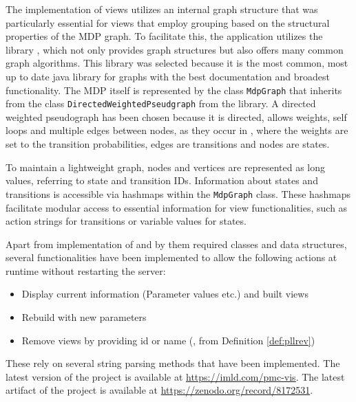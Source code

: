 \documentclass[preview]{standalone}
\begin{document}
The implementation of views utilizes an internal graph structure that was particularly essential for views that employ grouping based on the structural properties of the MDP graph. To facilitate this, the application utilizes the \jgrapht library \cite{Michail2020}, which not only provides graph structures but also offers many common graph algorithms. This library was selected because it is the most common, most up to date java library for graphs with the best documentation and broadest functionality. The MDP itself is represented by the class \texttt{MdpGraph} that inherits from the class \texttt{DirectedWeightedPseudgraph} from the \jgrapht library. A directed weighted pseudograph has been chosen because it is directed, allows weights, self loops and multiple edges between nodes, as they occur in \chgphsN, where the weights are set to the transition probabilities, edges are transitions and nodes are states.

To maintain a lightweight graph, nodes and vertices are represented as long values, referring to state and transition IDs. Information about states and transitions is accessible via hashmaps within the \texttt{MdpGraph} class. These hashmaps facilitate modular access to essential information for view functionalities, such as action strings for transitions or variable values for states.

Apart from implementation of \viewsN and by them required classes and data structures, several functionalities have been implemented to allow the following actions at runtime without restarting the server:
\begin{itemize}
	\item Display current \viewN information (Parameter values etc.) and built views
	\item Rebuild \viewN with new parameters
	\item Remove views by providing id or name (\pllrev, from Definition \ref{def:pllrev})	
\end{itemize}

These rely on several string parsing methods that have been implemented. The latest version of the project \pmcvis is available at \url{https://imld.com/pmc-vis}. The latest artifact of the project is available at \url{https://zenodo.org/record/8172531}.
\end{document}
